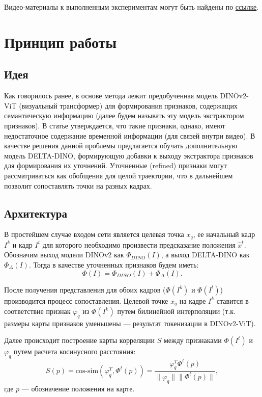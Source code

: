 \documentclass[a4paper, 14pt]{extarticle}
\theoremstyle{definition}
\theoremstyle{plain}
\theoremstyle{remark}
\begin{document}
Видео-материалы к выполненным экспериментам могут быть найдены по \href{https://drive.google.com/drive/folders/1OhjDO-olEEyySXN8FETYPrz6gLZjzuJF?usp=drive_link}{ссылке}.

\newpage

\section{Принцип работы}
\subsection{Идея}
Как говорилось ранее, в основе метода лежит предобученная модель DINOv2-ViT (визуальный трансформер) для формирования признаков, содержащих семантическую информацию (далее будем называть эту модель экстрактором признаков). 
В статье утверждается, что такие признаки, однако, имеют недостаточное содержание временной информации (для связей внутри видео). В качестве решения данной проблемы предлагается обучать дополнительную модель DELTA-DINO, формирующую добавки к выходу экстрактора признаков для формирования их уточнений. Уточненные (refined) признаки могут рассматриваться как обобщения для целой траектории, что в дальнейшем позволит сопоставлять точки на разных кадрах.

\subsection{Архитектура}
В простейшем случае входом сети является целевая точка $x_q$, ее начальный кадр $I^k$ и кадр $I^t$ для которого необходимо произвести предсказание положения $\hat{x}^t$. Обозначим выход модели DINOv2 как $\Phi_{DINO}(I)$, а выход DELTA-DINO как $\Phi_{\Delta}(I)$. Тогда в качестве уточненных признаков будем иметь:
\begin{equation}
	\Phi(I) = \Phi_{DINO}(I) + \Phi_{\Delta}(I).
\end{equation}

После получения представления для обоих кадров ($\Phi(I^k)$ и $\Phi(I^t)$) производится процесс сопоставления. Целевой точке $x_q$ на кадре $I^k$ ставится в соответствие признак $\varphi_q$ из $\Phi(I^k)$ путем билинейной интерполяции (т.к. размеры карты признаков уменьшены --- результат токенизации в DINOv2-ViT).

Далее происходит построение карты корреляции $S$ между признаками $\Phi(I^t)$ и $\varphi_q$ путем расчета косинусного расстояния:
\begin{equation}
	S(p) = \text{cos-sim}(\varphi_q^T, \Phi^t(p))= \frac{\varphi_q^T \Phi^t(p)}{\|\varphi_q\|\|\Phi^t(p)\|},
\end{equation}
где $p$ --- обозначение положения на карте.
\end{document}
